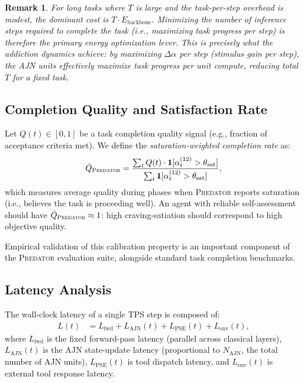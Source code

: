 \documentclass[12pt,a4paper]{article}
\newtheorem{remark}{Remark}[section]
\newcommand{\PREDATOR}{\textsc{Predator}}
\begin{document}
\begin{remark}
For long tasks where $T$ is large and the task-per-step overhead is modest,
the dominant cost is $T \cdot E_{\text{backbone}}$. Minimizing the number
of inference steps required to complete the task (i.e., maximizing task
progress per step) is therefore the primary energy optimization lever. This
is precisely what the addiction dynamics achieve: by maximizing $\Delta\alpha$
per step (stimulus gain per step), the AJN units effectively maximize task
progress per unit compute, reducing total $T$ for a fixed task.
\end{remark}

\subsection{Completion Quality and Satisfaction Rate}

Let $Q(t) \in [0,1]$ be a task completion quality signal (e.g., fraction
of acceptance criteria met). We define the \textit{saturation-weighted
completion rate} as:
\begin{equation}
  \bar{Q}_{\PREDATOR} = \frac{\sum_t Q(t) \cdot \mathbf{1}[\alpha_t^{(12)} > \theta_{\text{sat}}]}
    {\sum_t \mathbf{1}[\alpha_t^{(12)} > \theta_{\text{sat}}]},
  \label{eq:qual}
\end{equation}
which measures average quality during phases when \PREDATOR{} reports
saturation (i.e., believes the task is proceeding well). An agent with
reliable self-assessment should have $\bar{Q}_{\PREDATOR} \approx 1$: high
craving-satiation should correspond to high objective quality.

Empirical validation of this calibration property is an important component
of the \PREDATOR{} evaluation suite, alongside standard task completion
benchmarks.

\subsection{Latency Analysis}

The wall-clock latency of a single TPS step is composed of:
\begin{align}
  L(t) &= L_{\text{fwd}} + L_{\text{AJN}}(t) + L_{\text{PSE}}(t) + L_{\text{env}}(t),
  \label{eq:latency}
\end{align}
where $L_{\text{fwd}}$ is the fixed forward-pass latency (parallel across
classical layers), $L_{\text{AJN}}(t)$ is the AJN state-update latency
(proportional to $N_{\text{AJN}}$, the total number of AJN units),
$L_{\text{PSE}}(t)$ is tool dispatch latency, and $L_{\text{env}}(t)$ is
external tool response latency.
\end{document}
